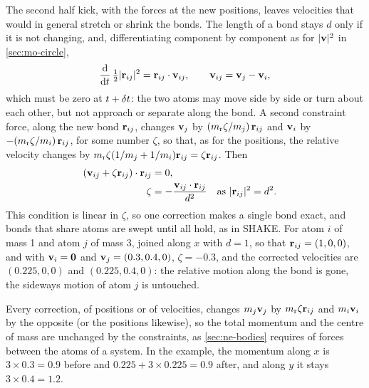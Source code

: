 The second half kick, with the forces at the new positions, leaves
velocities that would in general stretch or shrink the bonds. The length
of a bond stays $d$ only if it is not changing, and, differentiating
component by component as for $\lvert\bm{\mathrm{v}}\rvert^2$ in
\cref{sec:mo-circle},
\begin{equation*}
   \frac{\mathrm{d}}{\mathrm{d} t}\,\tfrac12\lvert\bm{\mathrm{r}}_{ij}\rvert^2
   = \bm{\mathrm{r}}_{ij}\cdot\bm{\mathrm{v}}_{ij} ,
   \qquad \bm{\mathrm{v}}_{ij} = \bm{\mathrm{v}}_j - \bm{\mathrm{v}}_i ,
\end{equation*}
which must be zero at $t + \delta t$: the two atoms may move side by side or
turn about each other, but not approach or separate along the bond. A
second constraint force, along the new bond $\bm{\mathrm{r}}_{ij}$, changes $\bm{\mathrm{v}}_j$
by $(m_{\mathrm r}\zeta/m_j)\,\bm{\mathrm{r}}_{ij}$ and $\bm{\mathrm{v}}_i$ by
$-(m_{\mathrm r}\zeta/m_i)\,\bm{\mathrm{r}}_{ij}$, for some number $\zeta$, so that,
as for the positions, the relative velocity changes by $m_{\mathrm
r}\zeta(1/m_j + 1/m_i)\bm{\mathrm{r}}_{ij} = \zeta\bm{\mathrm{r}}_{ij}$. Then
\begin{align*}
   (\bm{\mathrm{v}}_{ij} + \zeta\bm{\mathrm{r}}_{ij})\cdot\bm{\mathrm{r}}_{ij} &= 0 ,\\
   \zeta &= -\frac{\bm{\mathrm{v}}_{ij}\cdot\bm{\mathrm{r}}_{ij}}{d^2}
   && \text{as $\lvert\bm{\mathrm{r}}_{ij}\rvert^2 = d^2$.}
\end{align*}
This condition is linear in $\zeta$, so one correction makes a single
bond exact, and bonds that share atoms are swept until all hold, as in
SHAKE. For atom $i$ of mass 1 and atom $j$ of mass 3, joined along $x$
with $d = 1$, so that $\bm{\mathrm{r}}_{ij} = (1, 0, 0)$, and with $\bm{\mathrm{v}}_i =
\bm{\mathrm{0}}$ and $\bm{\mathrm{v}}_j = (0.3, 0.4, 0)$, $\zeta = -0.3$, and the corrected
velocities are $(0.225, 0, 0)$ and $(0.225, 0.4, 0)$: the relative motion
along the bond is gone, the sideways motion of atom $j$ is untouched.

Every correction, of positions or of velocities, changes $m_j\bm{\mathrm{v}}_j$ by
$m_{\mathrm r}\zeta\bm{\mathrm{r}}_{ij}$ and $m_i\bm{\mathrm{v}}_i$ by the opposite (or the
positions likewise), so the total momentum and the centre of mass are
unchanged by the constraints, as \cref{sec:ne-bodies} requires of forces
between the atoms of a system. In the example, the momentum along $x$ is
$3\times0.3 = 0.9$ before and $0.225 + 3\times0.225 = 0.9$ after, and
along $y$ it stays $3\times0.4 = 1.2$.

